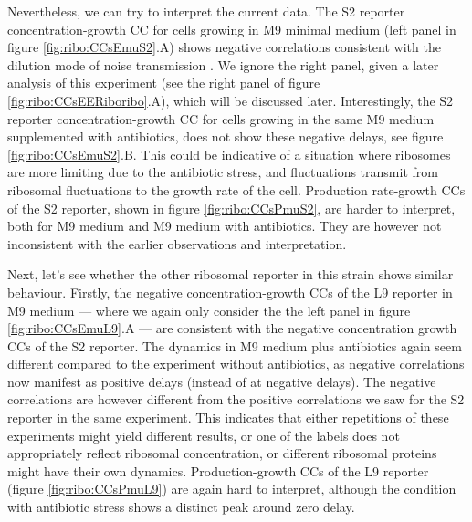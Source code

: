 Nevertheless, we can try to interpret the current data.
%
The S2 reporter concentration-growth CC for cells growing in M9 minimal medium (left panel in figure \ref{fig:ribo:CCsEmuS2}.A) 
shows negative correlations consistent with the dilution mode of noise transmission \cite{Kiviet2014}.
%
We ignore the right panel, 
given a later analysis of this experiment 
(see the right panel of figure \ref{fig:ribo:CCsEERiboribo}.A), which will be discussed later.
%
Interestingly, 
the S2 reporter concentration-growth CC for cells growing in the same M9 medium supplemented with antibiotics, does not show these negative delays, see figure \ref{fig:ribo:CCsEmuS2}.B. 
This could be indicative of a situation where ribosomes are more limiting due to the antibiotic stress, and fluctuations transmit from ribosomal fluctuations to the growth rate of the cell.
%
Production rate-growth CCs of the S2 reporter, shown in figure \ref{fig:ribo:CCsPmuS2}, are harder to interpret, both for M9 medium and M9 medium with antibiotics.
They are however not inconsistent with the earlier observations and interpretation.

Next, let's see whether the other ribosomal reporter in this strain shows similar behaviour.
Firstly, the negative concentration-growth CCs of the L9 reporter in M9 medium --- where we again only consider the the left panel in figure \ref{fig:ribo:CCsEmuL9}.A --- are consistent with the negative concentration growth CCs of the S2 reporter.  
The dynamics in M9 medium plus antibiotics again seem different compared to the experiment without antibiotics, as negative correlations now manifest as positive delays (instead of at negative delays).
The negative correlations are however different from the positive correlations we saw for the S2 reporter in the same experiment.
%
This indicates that either repetitions of these experiments might yield different results, or one of the labels does not appropriately reflect ribosomal concentration, or different ribosomal proteins might have their own dynamics.
%
Production-growth CCs of the L9 reporter (figure \ref{fig:ribo:CCsPmuL9}) are again hard to interpret, although the condition with antibiotic stress shows a distinct peak around zero delay.

